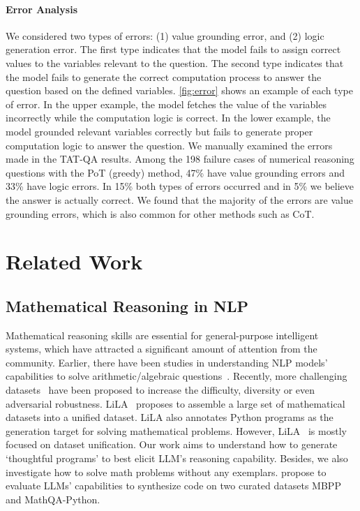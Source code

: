 \paragraph{Error Analysis}

We considered two types of errors: (1) value grounding error, and (2) logic generation error. The first type indicates that the model fails to assign correct values to the variables relevant to the question. The second type indicates that the model fails to generate the correct computation process to answer the question based on the defined variables. \autoref{fig:error} shows an example of each type of error. In the upper example, the model fetches the value of the variables incorrectly while the computation logic is correct. In the lower example, the model grounded relevant variables correctly but fails to generate proper computation logic to answer the question. We manually examined the errors made in the TAT-QA results. Among the 198 failure cases of numerical reasoning questions with the PoT (greedy) method, 47\% have value grounding errors and 33\% have logic errors. In 15\% both types of errors occurred and in 5\% we believe the answer is actually correct. We found that the majority of the errors are value grounding errors, which is also common for other methods such as CoT.

\section{Related Work}

\subsection{Mathematical Reasoning in NLP} Mathematical reasoning skills are essential for general-purpose intelligent systems, which have attracted a significant amount of attention from the community. Earlier, there have been studies in understanding NLP models' capabilities to solve arithmetic/algebraic questions~\citep{hosseini2014learning,koncel2015parsing,roy2015solving,ling2017program,roy2018mapping}. Recently, more challenging datasets~\citep{dua2019drop,saxton2019analysing,miao2020diverse,amini2019mathqa,hendrycks2021measuring,patel-etal-2021-nlp} have been proposed to increase the difficulty, diversity or even adversarial robustness. LiLA~\citep{Mishra2022Lila} proposes to assemble a large set of mathematical datasets into a unified dataset. LiLA also annotates Python programs as the generation target for solving mathematical problems. However, LiLA~\citep{Mishra2022Lila} is mostly focused on dataset unification. Our work aims to understand how to generate `thoughtful programs' to best elicit LLM's reasoning capability. Besides, we also investigate how to solve math problems without any exemplars. \cite{austin2021program} propose to evaluate LLMs' capabilities to synthesize code on two curated datasets MBPP and MathQA-Python. 

